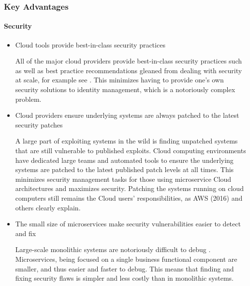 \begin{frame}
  \frametitle{Key Advantages}
  \framesubtitle{Security}
  \begin{itemize}
    \item<1-> Cloud tools provide best-in-class security practices

           {\scriptsize{All of the major cloud providers provide best-in-class security practices such as well as best practice recommendations gleaned from dealing with security at scale, for example see \parencite{AWSSecurityBest}. This minimizes having to provide one's own security solutions to identity management, which is a notoriously complex problem.   }}

    \item<2-> Cloud providers ensure underlying systems are always patched to the latest security patches

           {\scriptsize{A large part of exploiting systems in the wild is finding unpatched systems that are still vulnerable to published exploits. Cloud computing environments have dedicated large teams and automated tools to ensure the underlying systems are patched to the latest published patch levels at all times. This minimizes security management tasks for those using microservice Cloud architectures and maximizes security. Patching the systems running on cloud computers still remains the Cloud users' responsibilities, as AWS (2016) and others clearly explain.}}

    \item<1-> The small size of microservices make security vulnerabilities easier to detect and fix

           {\scriptsize{Large-scale monolithic systems are notoriously difficult to debug \parencite{ahnScalableTemporalOrder2009}. Microservices, being focused on a single business functional component are smaller, and thus easier and faster to debug. This means that finding and fixing security flaws is simpler and less costly than in monolithic systems.}}


  \end{itemize}
\end{frame}
